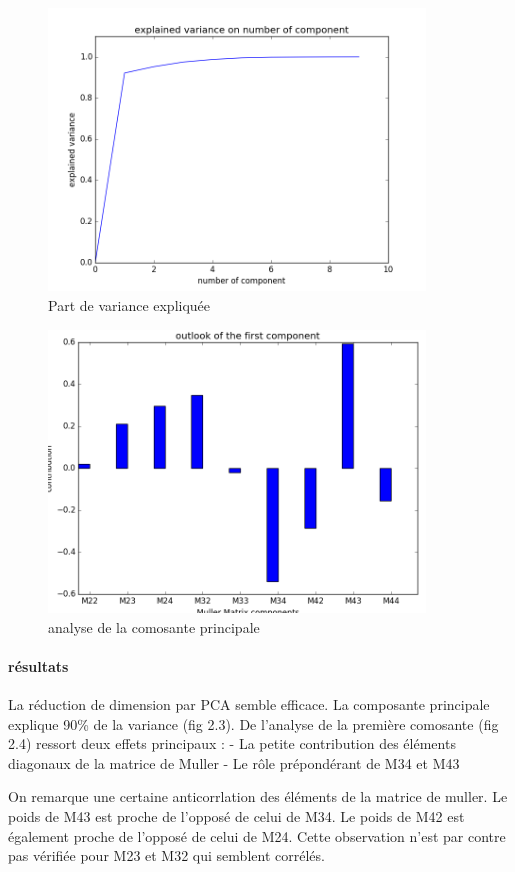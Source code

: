 \documentclass[a4paper,10pt]{report}
\begin{document}
\begin{figure}
  \caption{Part de variance expliquée}
  \centering
  \includegraphics[width=10cm]{PCA_3.png}
\end{figure}
\begin{figure}
  \caption{analyse de la comosante principale}
  \centering
  \includegraphics[width=10cm]{PCA_2.png}
\end{figure}

\paragraph{résultats}
La réduction de dimension par PCA semble efficace. La composante principale explique 90\% de la variance (fig 2.3). 
De l'analyse de la première comosante (fig 2.4) ressort deux effets principaux :
- La petite contribution des éléments diagonaux de la matrice de Muller
- Le rôle prépondérant de M34 et M43

On remarque une certaine anticorrlation des éléments de la matrice de muller. Le poids de M43 est proche de l'opposé de celui de M34. Le poids de M42 est également proche de l'opposé de celui de M24. Cette observation n'est par contre pas vérifiée pour M23 et M32 qui semblent corrélés.
\end{document}
